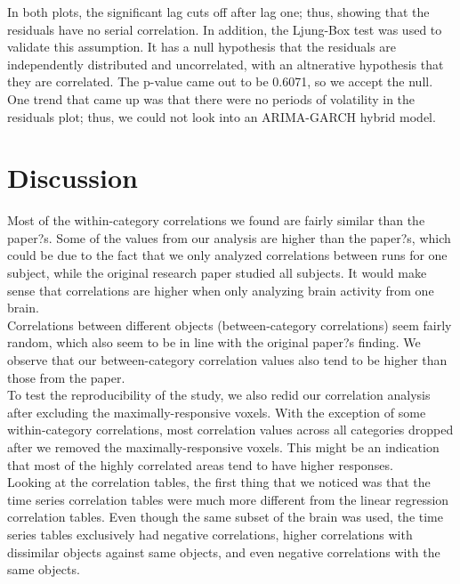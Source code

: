 \documentclass[11pt,twocolumn]{article}
\begin{document}
In both plots, the significant lag cuts off after lag one;
thus, showing that the residuals have no serial correlation. In addition, the
Ljung-Box test was used to validate this assumption. It has a null hypothesis
that the residuals are independently distributed and uncorrelated, with an
altnerative hypothesis that they are correlated. The p-value came out to be
0.6071, so we accept the null. One trend that came up was that there were
no periods of volatility in the residuals plot; thus, we could not look into
an ARIMA-GARCH hybrid model.


\section{Discussion}

Most of the within-category correlations we found are fairly similar than the paper?s. 
Some of the values from our analysis are higher than the paper?s, which could be 
due to the fact that we only analyzed correlations between runs for one subject, 
while the original research paper studied all subjects. It would make sense that 
correlations are higher when only analyzing brain activity from one brain. \\

Correlations between different objects (between-category correlations) seem 
fairly random, which also seem to be in line with the original paper?s finding. 
We observe that our between-category correlation values also tend to be higher 
than those from the paper. \\

To test the reproducibility of the study, we also redid our correlation analysis 
after excluding the maximally-responsive voxels. With the exception of some 
within-category correlations, most correlation values across all categories dropped 
after we removed the maximally-responsive voxels. This might be an indication 
that most of the highly correlated areas tend to have higher responses. \\

Looking at the correlation tables, the first thing that we noticed was that
the time series correlation tables were much more different from the linear
regression correlation tables. Even though the same subset of the brain was 
used, the time series tables exclusively had negative correlations, higher 
correlations with dissimilar objects against same objects, and even negative
correlations with the same objects. \\
\end{document}

